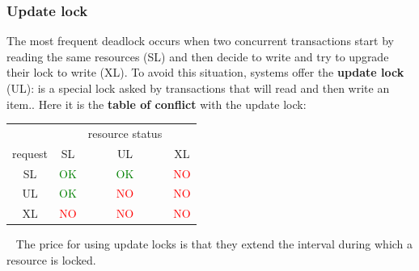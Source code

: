 \subsubsection{Update lock}
The most frequent deadlock occurs when two concurrent
transactions start by reading the same resources (SL) and
then decide to write and try to upgrade their lock to write (XL).\newline
\newline
To avoid this situation, systems offer the \textbf{update lock} (UL): is a special lock asked by transactions that will read and then write an item..\newline
\newline
Here it is the \textbf{table of conflict} with the update lock:
\renewcommand{\arraystretch}{1.5}
\begin{center}
    \begin{tabular}{ |c|c c c| } 
     \hline
      & & resource status & \\
     request & SL & UL & XL \\ 
     \hline
     SL & \textcolor{green}{OK} & \textcolor{green}{OK} & \textcolor{red}{NO} \\ 
     UL & \textcolor{green}{OK} & \textcolor{red}{NO} & \textcolor{red}{NO} \\ 
     XL & \textcolor{red}{NO} & \textcolor{red}{NO} & \textcolor{red}{NO} \\ 
     \hline
    \end{tabular}
\end{center}
\renewcommand{\arraystretch}{1}
\ \newline
The price for using update locks is that they extend the interval during which a resource is locked.
